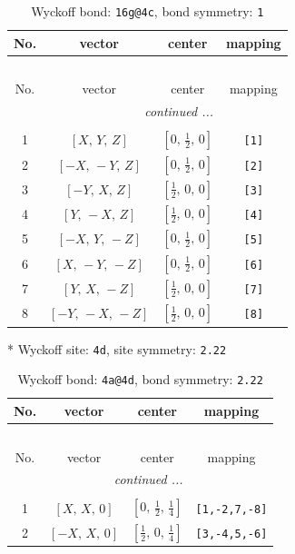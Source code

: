 \documentclass[fleqn,8pt]{jsarticle}
\begin{document}
\begin{longtable}{cccc}
\caption{Wyckoff bond: {\tt 16g@4c}, bond symmetry: {\tt 1}}
 \\
 \hline \hline
No. & vector & center & mapping \\ \hline \endfirsthead

\multicolumn{3}{l}{\tablename\ \thetable{}} \\
 \hline \hline
No. & vector & center & mapping \\ \hline \endhead

 \hline \hline
\multicolumn{3}{r}{\footnotesize\it continued ...} \\ \endfoot

 \hline \hline
\multicolumn{3}{r}{} \\ \endlastfoot

1 & $\left[ X,\, Y,\, Z \right]$ & $\left[ 0,\, \frac{1}{2},\, 0 \right]$ & {\tt [1]} \\ \hline
2 & $\left[ - X,\, - Y,\, Z \right]$ & $\left[ 0,\, \frac{1}{2},\, 0 \right]$ & {\tt [2]} \\ \hline
3 & $\left[ - Y,\, X,\, Z \right]$ & $\left[ \frac{1}{2},\, 0,\, 0 \right]$ & {\tt [3]} \\ \hline
4 & $\left[ Y,\, - X,\, Z \right]$ & $\left[ \frac{1}{2},\, 0,\, 0 \right]$ & {\tt [4]} \\ \hline
5 & $\left[ - X,\, Y,\, - Z \right]$ & $\left[ 0,\, \frac{1}{2},\, 0 \right]$ & {\tt [5]} \\ \hline
6 & $\left[ X,\, - Y,\, - Z \right]$ & $\left[ 0,\, \frac{1}{2},\, 0 \right]$ & {\tt [6]} \\ \hline
7 & $\left[ Y,\, X,\, - Z \right]$ & $\left[ \frac{1}{2},\, 0,\, 0 \right]$ & {\tt [7]} \\ \hline
8 & $\left[ - Y,\, - X,\, - Z \right]$ & $\left[ \frac{1}{2},\, 0,\, 0 \right]$ & {\tt [8]} \\
\end{longtable}
* Wyckoff site: {\tt 4d}, site symmetry: {\tt 2.22}
\renewcommand{\arraystretch}{1.2}
\begin{longtable}{cccc}
\caption{Wyckoff bond: {\tt 4a@4d}, bond symmetry: {\tt 2.22}}
 \\
 \hline \hline
No. & vector & center & mapping \\ \hline \endfirsthead

\multicolumn{3}{l}{\tablename\ \thetable{}} \\
 \hline \hline
No. & vector & center & mapping \\ \hline \endhead

 \hline \hline
\multicolumn{3}{r}{\footnotesize\it continued ...} \\ \endfoot

 \hline \hline
\multicolumn{3}{r}{} \\ \endlastfoot

1 & $\left[ X,\, X,\, 0 \right]$ & $\left[ 0,\, \frac{1}{2},\, \frac{1}{4} \right]$ & {\tt [1,-2,7,-8]} \\ \hline
2 & $\left[ - X,\, X,\, 0 \right]$ & $\left[ \frac{1}{2},\, 0,\, \frac{1}{4} \right]$ & {\tt [3,-4,5,-6]} \\
\end{longtable}
\end{document}
